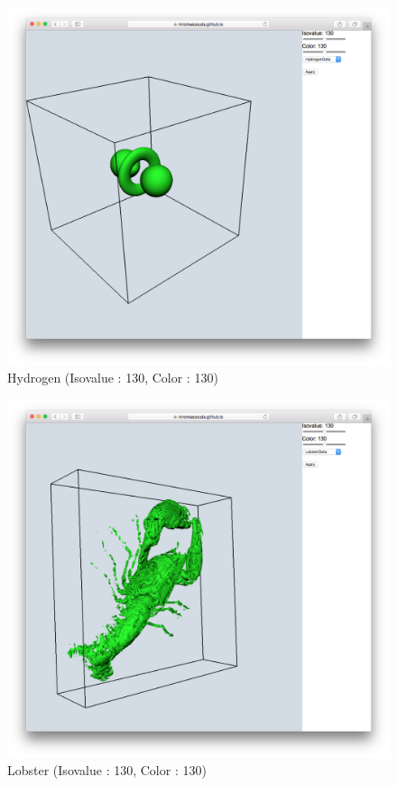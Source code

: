 \documentclass[a4paper]{jsarticle}
\begin{document}
\begin{figure}[htbp]
\begin{minipage}{0.5\hsize}
\begin{center}
\includegraphics[scale = 0.18]{vis_hyd1.png}
\\ Hydrogen (Isovalue : 130, Color : 130)
\end{center}
\end{minipage}
\begin{minipage}{0.5\hsize}
\begin{center}
\includegraphics[scale = 0.18]{vis_lob1.png}
\\ Lobster (Isovalue : 130, Color : 130)
\end{center}
\end{minipage}
\end{figure}
\end{document}
